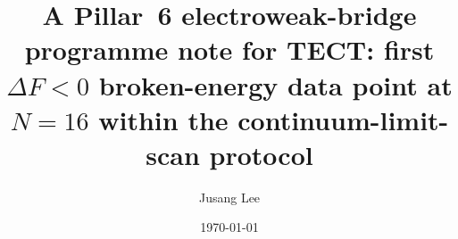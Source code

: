 



\title{A Pillar~6 electroweak-bridge programme note for TECT: first
$\Delta F<0$ broken-energy data point at $N=16$ within the
continuum-limit-scan protocol}

\author{Jusang Lee}

\date{\today}

